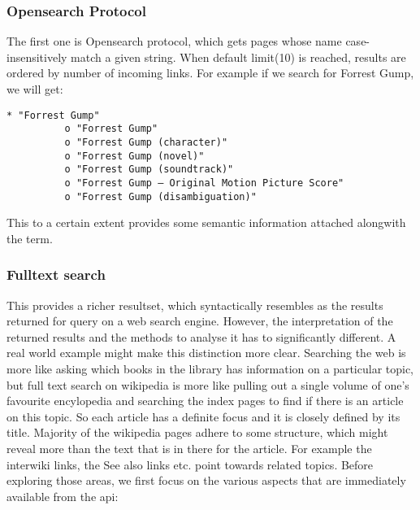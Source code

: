 \documentclass[11pt]{article}
\begin{document}
\subsubsection{Opensearch Protocol}
The first one is Opensearch protocol, which gets pages whose name case-insensitively match a given string. When default limit(10) is reached, results are ordered by number of incoming links. For example if we search for Forrest Gump, we will get:

\begin{lstlisting}[label=Opensearch Protocol, caption=Result using Opensearch]
    * "Forrest Gump"
          o "Forrest Gump"
          o "Forrest Gump (character)"
          o "Forrest Gump (novel)"
          o "Forrest Gump (soundtrack)"
          o "Forrest Gump – Original Motion Picture Score"
          o "Forrest Gump (disambiguation)"

\end{lstlisting}

This to a certain extent provides some semantic information attached alongwith the term.

\subsubsection{Fulltext search}
This provides a richer resultset, which syntactically resembles as the results returned for query on a web search engine. However, the interpretation of the returned results and the methods to analyse it has to significantly different. A real world example might make this distinction more clear. Searching the web is more like asking which books in the library has information on a particular topic, but full text search on wikipedia is more like pulling out a single volume of one's favourite encylopedia and searching the index pages to find if there is an article on this topic. So each article has a definite focus and it is closely defined by its title. Majority of the wikipedia pages adhere to some structure, which might reveal more than the text that is in there for the article. For example the interwiki links, the See also links etc. point towards related topics. Before exploring those areas, we first focus on the various aspects that are immediately available from the api:
\end{document}
